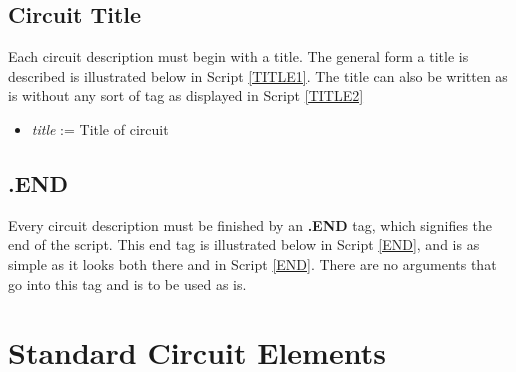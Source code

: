 \documentclass{article}
\begin{document}
\subsection{Circuit Title}
Each circuit description must begin with a title. The general form a title is described is illustrated below in Script \ref{TITLE1}. The title can also be written as is without any sort of tag as displayed in Script \ref{TITLE2}
\begin{center}
\end{center}

\begin{center}
\end{center}

\begin{itemize}
\item \textit{title} := Title of circuit
\end{itemize}
\subsection{.END}
Every circuit description must be finished by an \textbf{.END} tag, which signifies the end of the script. This end tag is illustrated below in Script \ref{END}, and is as simple as it looks both there and in Script \ref{END}. There are no arguments that go into this tag and is to be used as is.

\begin{center}
\end{center}

\cleardoublepage
\section{Standard Circuit Elements} 
\cleardoublepage
\setcounter{page}{1}
\nocite{PennEngineering}	
\nocite{ngspiceManual27}


\end{document}
